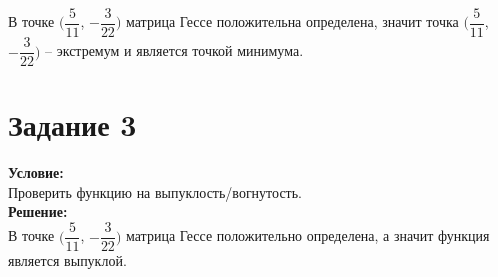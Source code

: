 \documentclass[14pt,a4paper,fleqn]{extarticle}
\begin{document}
	В точке $(\dfrac{5}{11}$, $-\dfrac{3}{22})$ матрица Гессе положительна определена, значит точка $(\dfrac{5}{11}$, $-\dfrac{3}{22})$ -- экстремум и является точкой минимума.
	
	\section*{Задание 3}
	\textbf{Условие:}\\
	Проверить функцию на выпуклость/вогнутость.\\
	
	\textbf{Решение:}\\
	
	В точке $(\dfrac{5}{11}$, $-\dfrac{3}{22})$ матрица Гессе положительно определена, а значит функция является выпуклой.
\end{document}
